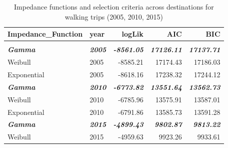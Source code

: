 \documentclass[
11pt, %
oneside, %
english, %
singlespacing, %
]{macthesis} %
\begin{document}
\begin{table}
\centering
\caption{\label{tab:ch03-make-table-05}\label{tab:ch03-table-05}Impedance functions and selection criteria across destinations for walking trips (2005, 2010, 2015)}
\centering
\fontsize{9}{11}\selectfont
\begin{tabular}[t]{llrrr}
\toprule
Impedance\_Function & year & logLik & AIC & BIC\\
\midrule
\addlinespace[0.3em]
\multicolumn{5}{l}{\textbf{Destination: Home}}\\
\begingroup\fontsize{10}{12}\selectfont \em{\textbf{\hspace{1em}Gamma}}\endgroup & \begingroup\fontsize{10}{12}\selectfont \em{\textbf{2005}}\endgroup & \begingroup\fontsize{10}{12}\selectfont \em{\textbf{-8561.05}}\endgroup & \begingroup\fontsize{10}{12}\selectfont \em{\textbf{17126.11}}\endgroup & \begingroup\fontsize{10}{12}\selectfont \em{\textbf{17137.71}}\endgroup\\
\hspace{1em}Weibull & 2005 & -8585.21 & 17174.43 & 17186.03\\
\hspace{1em}Exponential & 2005 & -8618.16 & 17238.32 & 17244.12\\
\begingroup\fontsize{10}{12}\selectfont \em{\textbf{\hspace{1em}Gamma}}\endgroup & \begingroup\fontsize{10}{12}\selectfont \em{\textbf{2010}}\endgroup & \begingroup\fontsize{10}{12}\selectfont \em{\textbf{-6773.82}}\endgroup & \begingroup\fontsize{10}{12}\selectfont \em{\textbf{13551.64}}\endgroup & \begingroup\fontsize{10}{12}\selectfont \em{\textbf{13562.73}}\endgroup\\
\hspace{1em}Weibull & 2010 & -6785.96 & 13575.91 & 13587.01\\
\hspace{1em}Exponential & 2010 & -6791.86 & 13585.73 & 13591.28\\
\begingroup\fontsize{10}{12}\selectfont \em{\textbf{\hspace{1em}Gamma}}\endgroup & \begingroup\fontsize{10}{12}\selectfont \em{\textbf{2015}}\endgroup & \begingroup\fontsize{10}{12}\selectfont \em{\textbf{-4899.43}}\endgroup & \begingroup\fontsize{10}{12}\selectfont \em{\textbf{9802.87}}\endgroup & \begingroup\fontsize{10}{12}\selectfont \em{\textbf{9813.22}}\endgroup\\
\hspace{1em}Weibull & 2015 & -4959.63 & 9923.26 & 9933.61\\

\end{tabular}
\end{table}
\end{document}
